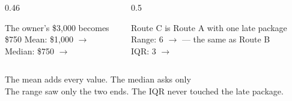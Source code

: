 \documentclass[aspectratio=169, 11pt]{beamer}
\begin{document}
\begin{frame}[t, plain]
  \vspace{6pt}
  \begin{columns}[t]
    \begin{column}{0.46\textwidth}
      \begin{block}{The owner's \$3{,}000 becomes \$750}
        Mean: \$1{,}000 $\to$ \\[3pt]
        Median: \$750 $\to$ 
      \end{block}
    \end{column}
    \begin{column}{0.5\textwidth}
      \begin{block}{Route C is Route A with one late package}
        Range: 6 $\to$  --- the same as Route B\\[3pt]
        IQR: 3 $\to$ 
      \end{block}
    \end{column}
  \end{columns}
  \vspace{14pt}
  \begin{center}
    {\large The mean adds every value. The median asks only }\\[6pt]
    {\small\color{slate} The range saw only the two ends. The IQR never touched the late
    package.}
  \end{center}
\end{frame}
\end{document}
